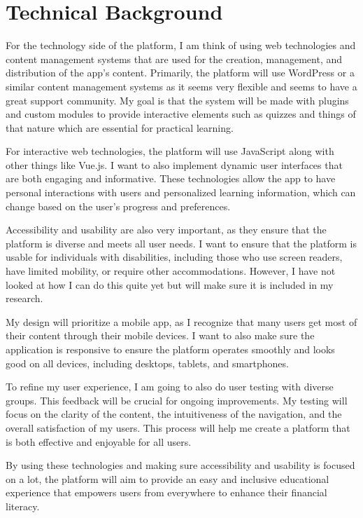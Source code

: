 \documentclass[12pt,twocolumn]{article}
\begin{document}
\section{Technical Background}
For the technology side of the platform, I am think of using web technologies and content management systems that are used for the creation, management, and distribution of the app's content. Primarily, the platform will use WordPress or a similar content management systems as it seems very flexible and seems to have a great support community. My goal is that the system will be made with plugins and custom modules to provide interactive elements such as quizzes and things of that nature which are essential for practical learning.

For interactive web technologies, the platform will use JavaScript along with other things like Vue.js. I want to also implement dynamic user interfaces that are both engaging and informative. These technologies allow the app to have personal interactions with users and personalized learning information, which can change based on the user’s progress and preferences.

Accessibility and usability are also very important, as they ensure that the platform is diverse and meets all user needs. I want to ensure that the platform is  usable for individuals with disabilities, including those who use screen readers, have limited mobility, or require other accommodations. However, I have not looked at how I can do this quite yet but will make sure it is included in my research.



My design will prioritize a mobile app, as I recognize that many users get most of their content through their mobile devices. I want to also make sure the application is responsive to ensure the platform operates smoothly and looks good on all devices, including desktops, tablets, and smartphones.

To refine my user experience, I am going to also do user testing with diverse groups. This feedback will be crucial for ongoing improvements. My testing will focus on the clarity of the content, the intuitiveness of the navigation, and the overall satisfaction of my users. This process will help me create a platform that is both effective and enjoyable for all users.

By using these technologies and making sure accessibility and usability is focused on a lot, the platform will aim to provide an easy and inclusive educational experience that empowers users from everywhere to enhance their financial literacy.
\end{document}
